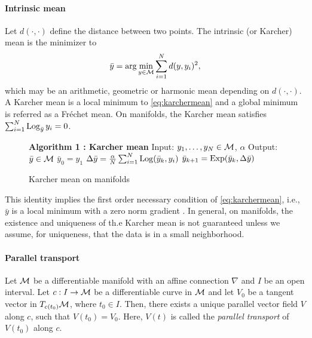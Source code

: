 \paragraph{Intrinsic mean} 
Let $d(\cdot,\cdot)$ define the distance between two points. The intrinsic (or Karcher) mean is the minimizer to
{\small \begin{equation}
\label{eq:karchermean}
\bar{y} = \arg \min_{y \in \mathcal{M}} \sum_{i=1}^{N} d(y,y_{i})^{2}, 
\end{equation}}
which may be an arithmetic, geometric or harmonic mean depending on $d(\cdot,\cdot)$. A Karcher mean is a local minimum to \eqref{eq:karchermean} and a global minimum is referred as a Fr\'{e}chet mean. On manifolds, the Karcher mean satisfies $\sum_{i=1}^{N} \operatorname*{Log}_{\bar{y}}y_i =0$.

 \begin{figure}[H]
 \begin{center}
 \begin{minipage}{.45\linewidth} 
 \begin{algorithmic}[plain]
 \STATE \textbf{Algorithm 1 : Karcher mean}
 \STATE Input: $y_{1}, \ldots, y_{N} \in \mathcal{M}$, $\alpha$
 \STATE Output: $\bar{y} \in \mathcal{M}$
 \STATE $\bar{y}_{0} = y_{1}$
 \STATE $\Delta\bar{y} = \frac{\alpha}{N} \sum_{i=1}^{N}\operatorname*{Log} (\bar{y}_k,y_i)$
 \STATE $\bar{y}_{k+1} = \operatorname*{Exp}(\bar{y}_k,\Delta \bar{y})$
 \ENDWHILE
  \end{algorithmic}
  \end{minipage}
  \end{center}
 \caption{Karcher mean on manifolds}
     \label{alg:karcher} 
 \end{figure}
 
This identity implies the first order necessary condition of \eqref{eq:karchermean}, i.e., $\bar{y}$ is a local minimum with a zero norm gradient \cite{karcher1977riemannian}. In general, on manifolds, the existence and uniqueness of th.e Karcher mean is not guaranteed unless we assume, for uniqueness, that the data is in a small neighborhood.\\

\paragraph{Parallel transport} 
Let $\mathcal{M}$ be a differentiable manifold with an affine connection $\nabla$ and $I$ be an open interval. Let $c:I \rightarrow \mathcal{M}$ be a differentiable curve in $\mathcal{M}$ and let $V_0$ be a tangent vector in $T_{c(t_0)}\mathcal{M}$, where $t_{0} \in I$. 
Then, there exists a unique parallel vector field $V$ along $c$, such that $V(t_0)=V_0$. Here, $V(t)$ is called the \textit{parallel transport} of $V(t_0)$ along $c$. 

